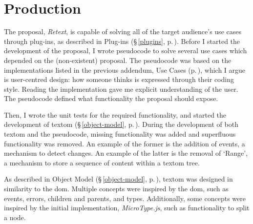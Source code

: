 
\begingroup
\let\clearpage\relax
\let\cleardoublepage\relax
\let\cleardoublepage\relax

\manualmark
{}

\chapter*{Production}\label{addendum-production}

The proposal, \emph{Retext}, is capable of solving all of the target
  audience's use cases through plug-ins, as described in Plug-ins
  (§\,\ref{plugins}, p.\,\pageref{plugins}).
Before I started the development of the proposal, I wrote pseudocode to
  solve several use cases which depended on the (non-existent) proposal.
The pseudocode was based on the implementations listed in the previous
  addendum, Use Cases (p.\,\pageref{addendum-use-cases}), which I argue is
  user-centred design: how someone thinks is expressed through their coding
  style.
Reading the implementation gave me explicit understanding of the user.
The pseudocode defined what functionality the proposal should expose.

Then, I wrote the unit tests for the required functionality, and started
  the development of \gls{textom} (§\,\ref{object-model},
  p.\,\pageref{object-model}).
During the development of both \gls{textom} and the pseudocode, missing
  functionality was added and superfluous functionality was removed.
An example of the former is the addition of events, a mechanism to detect
  changes.
An example of the latter is the removal of `Range', a mechanism to store a
  sequence of content within a \gls{textom} tree.

As described in Object Model (§\,\ref{object-model},
  p.\,\pageref{object-model}), \gls{textom} was designed in similarity to the
  \gls{dom}.
Multiple concepts were inspired by the \gls{dom}, such as events, errors,
  children and parents, and types.
Additionally, some concepts were inspired by the initial implementation,
  \emph{MicroType.js}, such as functionality to split a node.

